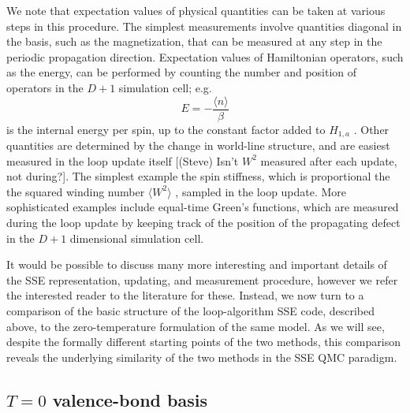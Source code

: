 \documentclass[vecphys]{svmult}
\begin{document}
We note that expectation values of physical quantities can be taken at various steps in this procedure.  The simplest measurements involve quantities diagonal in the basis, such as the magnetization, that can be measured at any step in the periodic propagation direction.  Expectation values of Hamiltonian operators, such as the energy, can be performed by counting the number and position of operators in the $D+1$ simulation cell; e.g.
\begin{equation}
E = - \frac{\langle n \rangle}{\beta}
\end{equation}
is the internal energy per spin, up to the constant factor added to $H_{1,a}$  \cite{Melko:Sandvik99}.
Other quantities are determined by the change in world-line structure, and are easiest measured in the loop update itself {\color{red}[(Steve) Isn't $W^2$ measured after each update, not during?]}.  The simplest example the spin stiffness, which is proportional the the squared winding number $\langle W^2 \rangle$ \cite{Melko:PC}, sampled in the loop update.  More sophisticated examples include equal-time Green's functions, which are measured during the loop update by keeping track of the position of the propagating defect in the $D+1$ dimensional simulation cell.

It would be possible to discuss many more interesting and important details of the SSE representation, updating, and measurement procedure, however we refer the interested reader to the literature for these.  Instead, we now turn to a comparison of the basic structure of the loop-algorithm SSE code, described above, to the zero-temperature formulation of the same model.  As we will see, despite the formally different starting points of the two methods, this comparison reveals the underlying similarity of the two methods in the SSE QMC paradigm.

\subsection{$T=0$ valence-bond basis} \label{Melko:VBB}
\end{document}
